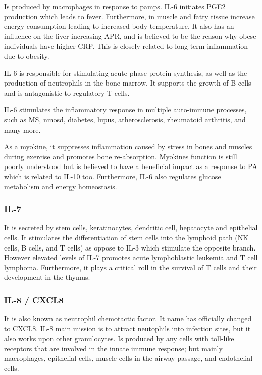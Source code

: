 Is produced by macrophages in response to \gls{pamps}. IL-6 initiates PGE2 production which leads to fever. Furthermore, in muscle and fatty tissue increase energy consumption leading to increased body temperature. It also has an influence on the liver increasing APR, and is believed to be the reason why obese individuals have higher CRP. This is closely related to long-term inflammation due to obesity.

IL-6 is responsible for stimulating acute phase protein synthesis, as well as the production of neutrophils in the bone marrow. It supports the growth of B cells and is antagonistic to regulatory T cells.

IL-6 stimulates the inflammatory response in multiple auto-immune processes, such as MS, \gls{nmosd}, diabetes, lupus, atherosclerosis, rheumatoid arthritis, and many more.

As a myokine, it suppresses inflammation caused by stress in bones and muscles during exercise and promotes bone re-absorption. Myokines function is still poorly understood but is believed to have a beneficial impact as a response to PA \cite{Ostrowski2000} which is related to IL-10 too. Furthermore, IL-6 also regulates glucose metabolism and energy homeostasis.

\subsubsection{IL-7}
\label{in:IL7}

It is secreted by stem cells, keratinocytes, dendritic cell, hepatocyte and epithelial cells. It stimulates the differentiation of stem cells into the lymphoid path (NK cells, B cells, and T cells) as oppose to IL-3 which stimulate the opposite branch. However elevated levels of IL-7 promotes acute lymphoblastic leukemia and T cell lymphoma. Furthermore, it plays a critical roll in the survival of T cells and their development in the thymus.

\subsubsection{IL-8 / CXCL8}
\label{in:IL8}

It is also known as neutrophil chemotactic factor. It name has officially changed to CXCL8. IL-8 main mission is to attract neutophils into infection sites, but it also works upon other granulocytes. Is produced by any cells with toll-like receptors that are involved in the innate immune response; but mainly macrophages, epithelial cells, muscle cells in the airway passage, and endothelial cells.

